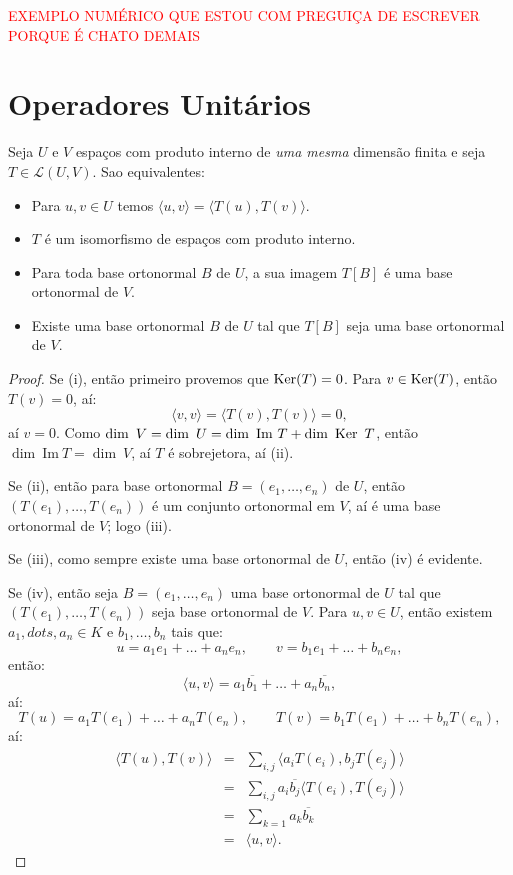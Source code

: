 \documentclass[11pt,twoside,a4paper]{book}
\begin{document}
\medskip
\noindent
\textcolor{red}{EXEMPLO NUMÉRICO QUE ESTOU COM PREGUIÇA DE ESCREVER PORQUE É CHATO DEMAIS}

\section{Operadores Unitários}

\begin{teorema}
Seja $U$ e $V$ espaços com produto interno de \emph{uma mesma} dimensão finita e seja $T\in\mathcal{L}(U,V)$. Sao equivalentes:
\begin{itemize}
\item Para $u,v\in U$ temos $\langle u,v\rangle=\langle T(u),T(v)\rangle$.
\item $T$ é um isomorfismo de espaços com produto interno.
\item Para toda base ortonormal $B$ de $U$, a sua imagem $T[B]$ é uma base ortonormal de $V$. 
\item Existe uma base ortonormal $B$ de $U$ tal que $T[B]$ seja uma base ortonormal de $V$.
\end{itemize}
\end{teorema}
\begin{proof}
Se (i), então primeiro provemos que $\operatorname{Ker}(T)=0$. Para $v\in \operatorname{Ker}(T)$, então $T(v)=0$, aí:
\[
\langle v,v\rangle=\langle T(v),T(v)\rangle=0,
\]
aí $v=0$. Como $\dim \ V=\dim \ U=\dim \ \mathrm{Im} \ T+\dim \ \Ker \ T$, então $\dim \ \mathrm{Im} \ T=\dim \ V$, aí $T$ é sobrejetora, aí (ii).

\medskip
\noindent
Se (ii), então para base ortonormal $B=(e_1,\dots,e_n)$ de $U$, então $(T(e_1),\dots,T(e_n))$ é um conjunto ortonormal em $V$, aí é uma base ortonormal de $V$; logo (iii).

\medskip
\noindent
Se (iii), como sempre existe uma base ortonormal de $U$, então (iv) é evidente.

\medskip
\noindent
Se (iv), então seja $B=(e_1,\dots,e_n)$ uma base ortonormal de $U$ tal que $(T(e_1),\dots,T(e_n))$ seja base ortonormal de $V$. Para $u,v\in U$, então existem $a_1,dots,a_n\in K$ e $b_1,\dots,b_n$ tais que:
\[
u=a_1e_1+\dots+a_ne_n,\quad\quad v=b_1e_1+\dots+b_ne_n,
\]
então:
\[
\langle u,v\rangle=a_1\overline{b_1}+\dots+a_n\overline{b_n},
\]
aí:
\[
T(u)=a_1T(e_1)+\dots+a_nT(e_n),\quad\quad T(v)=b_1T(e_1)+\dots+b_nT(e_n),
\]
aí:
\[
\begin{array}{rcl}
\langle T(u),T(v)\rangle&=&\sum_{i,j}\langle a_iT(e_i),b_jT(e_j)\rangle\\
&=&\sum_{i,j}a_i\overline{b_j}\langle T(e_i),T(e_j)\rangle\\
&=&\sum_{k=1}a_k\overline{b_k}\\
&=&\langle u,v\rangle.
\end{array}
\]
\end{proof}
\end{document}
